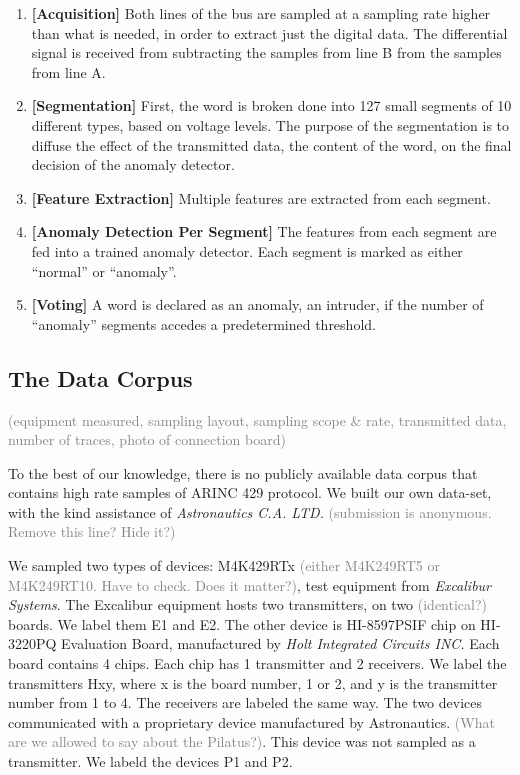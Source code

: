 \documentclass[conference]{IEEEtran}
\begin{document}
  \begin{enumerate}
    \item \textbf{[Acquisition]}
          Both lines of the bus are sampled at a sampling rate higher than what is needed, in order to extract just the digital data. The differential signal is received from subtracting the samples from line B from the samples from line A.
    \item \textbf{[Segmentation]}
          First, the word is broken done into 127 small segments of 10 different types, based on voltage levels. The purpose of the segmentation is to diffuse the effect of the transmitted data, the content of the word, on the final decision of the anomaly detector.
    \item \textbf{[Feature Extraction]}
          Multiple features are extracted from each segment. 
    \item \textbf{[Anomaly Detection Per Segment]}
          The features from each segment are fed into a trained anomaly detector. Each segment is marked as either ``normal'' or ``anomaly''.
    \item \textbf{[Voting]}
          A word is declared as an anomaly, an intruder, if the number of ``anomaly'' segments accedes a predetermined threshold.
  \end{enumerate}
  
\subsection{The Data Corpus}
  \textcolor{gray}{(equipment measured, sampling layout, sampling scope \& rate, transmitted data, number of traces, photo of connection board)}
  
  To the best of our knowledge, there is no publicly available data corpus that contains high rate samples of ARINC 429 protocol. We built our own data-set, with the kind assistance of \textit{Astronautics C.A. LTD.} \textcolor{gray}{(submission is anonymous. Remove this line? Hide it?)}
  
  We sampled two types of devices: M4K429RTx \textcolor{gray}{(either M4K249RT5 or M4K249RT10. Have to check. Does it matter?)}, test equipment from \textit{Excalibur Systems}. The Excalibur equipment hosts two transmitters, on two \textcolor{gray}{(identical?)} boards. We label them E1 and E2. The other device is HI-8597PSIF chip on HI-3220PQ Evaluation Board, manufactured by \textit{Holt Integrated Circuits INC.} Each board contains 4 chips. Each chip has 1 transmitter and 2 receivers. We label the transmitters H{x}{y}, where x is the board number, 1 or 2, and y is the transmitter number from 1 to 4. The receivers are labeled the same way. The two devices communicated with a proprietary device manufactured by Astronautics. \textcolor{gray}{(What are we allowed to say about the Pilatus?)}. This device was not sampled as a transmitter. We labeld the devices P1 and P2.
  
\end{document}
